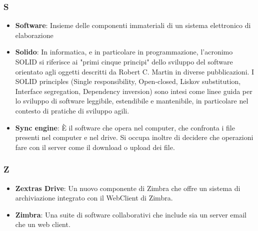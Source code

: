 \subsubsection*{S}
\begin{itemize}
	\item \textbf{Software}: Insieme delle componenti immateriali di un sistema elettronico di elaborazione
	\item \textbf{Solido}: In informatica, e in particolare in programmazione, l'acronimo SOLID si riferisce ai "primi cinque principi" dello sviluppo del software orientato agli oggetti descritti da Robert C. Martin in diverse pubblicazioni. I SOLID principles (Single responsibility, Open-closed, Liskov substitution, Interface segregation, Dependency inversion) sono intesi come linee guida per lo sviluppo di software leggibile, estendibile e mantenibile, in particolare nel contesto di pratiche di sviluppo agili.
	\item \textbf{Sync engine}: È il software che opera nel computer, che confronta i file presenti nel computer e nel drive. Si occupa inoltre di decidere che operazioni fare con il server come il download o upload dei file.
\end{itemize}

\subsubsection*{Z}
\begin{itemize}
	\item \textbf{Zextras Drive}: Un nuovo componente di Zimbra che offre un sistema di archiviazione integrato con il WebClient di Zimbra. 
	\item \textbf{Zimbra}: Una suite di software collaborativi che include sia un server email che un web client.
\end{itemize}